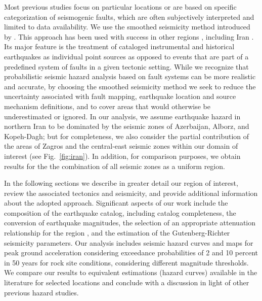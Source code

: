 Most previous studies focus on particular locations or are based on specific categorization of seismogenic faults, which are often subjectively interpreted and limited to data availability. We use the smoothed seismicity method introduced by \citet{Frankel1995}. This approach has been used with success in other regions \citep[e.g.][]{Boyd2008, Kalkan2009, Moschetti2014}, including Iran \citep{Khodaverdian_2016_BSSA}. Its major feature is the treatment of cataloged instrumental and historical earthquakes as individual point sources as opposed to events that are part of a predefined system of faults in a given tectonic setting. While we recognize that probabilistic seismic hazard analysis based on fault systems can be more realistic and accurate, by choosing the smoothed seismicity method we seek to reduce the uncertainty associated with fault mapping, earthquake location and source mechanism definitions, and to cover areas that would otherwise be underestimated or ignored. In our analysis, we assume earthquake hazard in northern Iran to be dominated by the seismic zones of Azerbaijan, Alborz, and Kopeh-Dagh; but for completeness, we also consider the partial contribution of the areas of Zagros and the central-east seismic zones within our domain of interest (see Fig.~\ref{fig:iran}). In addition, for comparison purposes, we obtain results for the the combination of all seismic zones as a uniform region.

In the following sections we describe in greater detail our region of interest, review the associated tectonics and seismicity, and provide additional information about the adopted approach. Significant aspects of our work include the composition of the earthquake catalog, including catalog completeness, the conversion of earthquake magnitudes, the selection of an appropriate attenuation relationship for the region \citep{Zafarani2014, Kalkan2004}, and the estimation of the Gutenberg-Richter seismicity parameters. Our analysis includes seismic hazard curves and maps for peak ground acceleration considering exceedance probabilities of 2 and 10 percent in 50 years for rock site conditions, considering different magnitude thresholds. We compare our results to equivalent estimations (hazard curves) available in the literature for selected locations and conclude with a discussion in light of other previous hazard studies.




